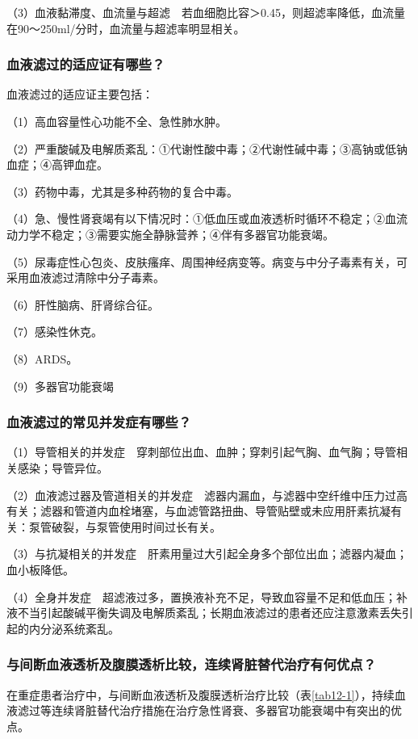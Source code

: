 （3）血液黏滞度、血流量与超滤　若血细胞比容＞0.45，则超滤率降低，血流量在90～250ml/分时，血流量与超滤率明显相关。

\subsubsection{血液滤过的适应证有哪些？}

血液滤过的适应证主要包括：

（1）高血容量性心功能不全、急性肺水肿。

（2）严重酸碱及电解质紊乱：①代谢性酸中毒；②代谢性碱中毒；③高钠或低钠血症；④高钾血症。

（3）药物中毒，尤其是多种药物的复合中毒。

（4）急、慢性肾衰竭有以下情况时：①低血压或血液透析时循环不稳定；②血流动力学不稳定；③需要实施全静脉营养；④伴有多器官功能衰竭。

（5）尿毒症性心包炎、皮肤瘙痒、周围神经病变等。病变与中分子毒素有关，可采用血液滤过清除中分子毒素。

（6）肝性脑病、肝肾综合征。

（7）感染性休克。

（8）ARDS。

（9）多器官功能衰竭

\subsubsection{血液滤过的常见并发症有哪些？}

（1）导管相关的并发症　穿刺部位出血、血肿；穿刺引起气胸、血气胸；导管相关感染；导管异位。

（2）血液滤过器及管道相关的并发症　滤器内漏血，与滤器中空纤维中压力过高有关；滤器和管道内血栓堵塞，与血滤管路扭曲、导管贴壁或未应用肝素抗凝有关：泵管破裂，与泵管使用时间过长有关。

（3）与抗凝相关的并发症　肝素用量过大引起全身多个部位出血；滤器内凝血；血小板降低。

（4）全身并发症　超滤液过多，置换液补充不足，导致血容量不足和低血压；补液不当引起酸碱平衡失调及电解质紊乱；长期血液滤过的患者还应注意激素丢失引起的内分泌系统紊乱。

\subsubsection{与间断血液透析及腹膜透析比较，连续肾脏替代治疗有何优点？}

在重症患者治疗中，与间断血液透析及腹膜透析治疗比较（表\ref{tab12-1}），持续血液滤过等连续肾脏替代治疗措施在治疗急性肾衰、多器官功能衰竭中有突出的优点。

